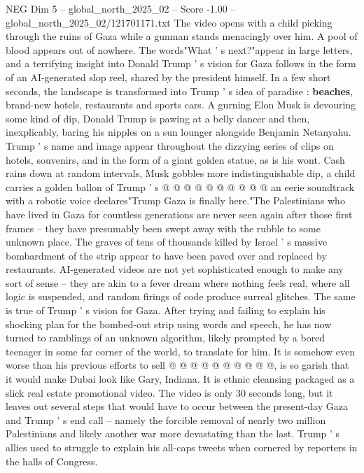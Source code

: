 \begin{textsample}{NEG Dim 5 – global\_north\_2025\_02 – Score -1.00 – global\_north\_2025\_02/121701171.txt}  \label{ex:f5_neg_126}
The video opens with a child picking through the ruins of Gaza while a gunman stands menacingly over him.
A pool of blood appears out of nowhere.
The words"What ' s next?"appear in large letters, and a terrifying insight into Donald Trump ' s vision for Gaza follows in the form of an AI-generated slop reel, shared by the president himself.
In a few short seconds, the landscape is transformed into Trump ' s idea of paradise : \textbf{beaches}, brand-new hotels, restaurants and sports cars.
A gurning Elon Musk is devouring some kind of dip, Donald Trump is pawing at a belly dancer and then, inexplicably, baring his nipples on a sun lounger alongside Benjamin Netanyahu.
Trump ' s name and image appear throughout the dizzying series of clips on hotels, souvenirs, and in the form of a giant golden statue, as is his wont.
Cash rains down at random intervals, Musk gobbles more indistinguishable dip, a child carries a golden ballon of Trump ' s @ @ @ @ @ @ @ @ @ @ an eerie soundtrack with a robotic voice declares"Trump Gaza is finally here."The Palestinians who have lived in Gaza for countless generations are never seen again after those first frames -- they have presumably been swept away with the rubble to some unknown place.
The graves of tens of thousands killed by Israel ' s massive bombardment of the strip appear to have been paved over and replaced by restaurants.
AI-generated videos are not yet sophisticated enough to make any sort of sense -- they are akin to a fever dream where nothing feels real, where all logic is suspended, and random firings of code produce surreal glitches.
The same is true of Trump ' s vision for Gaza.
After trying and failing to explain his shocking plan for the bombed-out strip using words and speech, he has now turned to ramblings of an unknown algorithm, likely prompted by a bored teenager in some far corner of the world, to translate for him.
It is somehow even worse than his previous efforts to sell @ @ @ @ @ @ @ @ @ @, is so garish that it would make Dubai look like Gary, Indiana.
It is ethnic cleansing packaged as a slick real estate promotional video.
The video is only 30 seconds long, but it leaves out several steps that would have to occur between the present-day Gaza and Trump ' s end call -- namely the forcible removal of nearly two million Palestinians and likely another war more devastating than the last.
Trump ' s allies used to struggle to explain his all-caps tweets when cornered by reporters in the halls of Congress.

\end{textsample}
